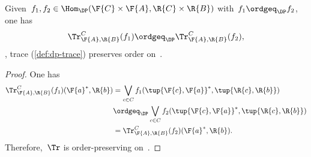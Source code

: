 \begin{lemma}
  Given~$f_1,f_2\in \Hom_\DP(\F{C}\times \F{A},\R{C}\times \R{B})$ with~$f_1\ordgeq_\DP f_2$, one has
  \begin{equation}
    \Tr_{\F{A},\R{B}}^C(f_1)\ordgeq_\DP \Tr_{\F{A},\R{B}}^C(f_2),
  \end{equation}
  \ie , trace (\cref{def:dp-trace}) preserves order on~\DP.
\end{lemma}

\begin{proof}
  One has
  \begin{equation}
    \begin{aligned}
      \Tr_{\F{A},\R{B}}^C(f_1)(\F{a}^*,\R{b})&=\bigvee_{c\in C}f_1(\tup{\F{c},\F{a}}^*,\tup{\R{c},\R{b}})\\
      &\ordgeq_\DP \bigvee_{c\in C}f_2(\tup{\F{c},\F{a}}^*,\tup{\R{c},\R{b}})\\
      &=\Tr_{\F{A},\R{B}}^C(f_2)(\F{a}^*,\R{b}).
    \end{aligned}
  \end{equation}
  Therefore,~$\Tr$ is order-preserving on~\DP.
\end{proof}
